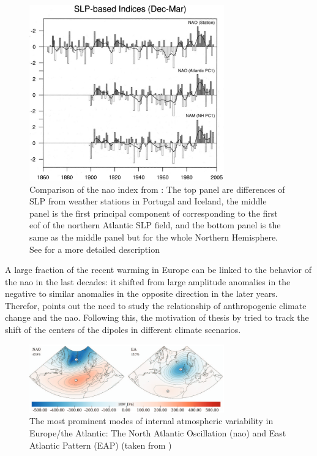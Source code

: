\begin{figure}[htb]
  \begin{center}
    \includegraphics[width=0.75\textwidth]{figures/hurrel_nao_index_comparison.png}
  \end{center}
  \caption{Comparison of the \ac{nao} index from \cite{hurrell_overview_2003}: The top panel are differences of SLP from weather stations in Portugal and Iceland, the middle panel is the first principal component of corresponding to the first \ac{eof} of the northern Atlantic SLP field, and the bottom panel is the same as the middle panel but for the whole Northern Hemisphere. See \cite{hurrell_overview_2003} for a more detailed description}
  \label{fig:naoindex_comparison}
\end{figure}

A large fraction of the recent warming in Europe can be linked to the behavior of the \ac{nao} in the last decades: it shifted from large amplitude anomalies in the negative to similar anomalies in the opposite direction in the later years. 
Therefor, \citeauthor{hurrell_overview_2003} points out the need to study the relationship of anthropogenic climate change and the \ac{nao}. 
Following this, the motivation of thesis \cite{vietinghoff_visual_2021} by \citeauthor{vietinghoff_visual_2021} tried to track the shift of the centers of the dipoles in different climate scenarios.   

\begin{figure}
  \begin{center}
    \includegraphics[width=0.75\textwidth]{figures/nao_eap.png}
  \end{center}
  \caption{The most prominent modes of internal atmospheric variability in Europe/the Atlantic: The North Atlantic Oscillation (\ac{nao}) and East Atlantic Pattern (EAP) (taken from \cite{vietinghoff_extension_2021})}\label{fig:nao eap}
\end{figure}


